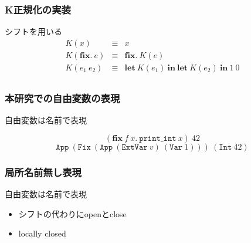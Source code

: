\documentclass[dvipdfmx,cjk,xcolor=dvipsnames,envcountsect,notheorems,12pt]{beamer}
\theoremstyle{definition}
\newcommand{\keyword}[1]{\mathbf{#1}}
\newcommand{\LET}{\keyword{let}}
\newcommand{\FIX}{\keyword{fix}}
\newcommand{\IN}{\keyword{in}}
\begin{document}
\begin{frame}[fragile]
	\frametitle{K正規化の実装}
	\LARGE シフトを用いる
	{\Large \[\begin{array}{rcl}
		K(x) & \equiv & x \\
		K(\FIX.~e) & \equiv & \FIX.~K(e) \\
		K(e_1~e_2) & \equiv & \LET~ K(e_1)~\IN~\LET~ K(e_2)~\IN~1~0 \\
	\end{array}\]}
\end{frame}

\begin{frame}
	\frametitle{本研究での自由変数の表現}
	\LARGE
	自由変数は名前で表現

	{\Large \[(\FIX~f~x.~\texttt{print\_int}~x)~42\]
	\[\texttt{App}~(\texttt{Fix}~(\texttt{App}~(\texttt{ExtVar}~v)~(\texttt{Var}~1)))~(\texttt{Int}~42)\]}
\end{frame}

\begin{frame}
	\frametitle{局所名前無し表現}
	\LARGE 自由変数は名前で表現
	\begin{itemize}
		\item シフトの代わりにopenとclose
		\item locally closed
	\end{itemize}

\end{frame}
\end{document}
